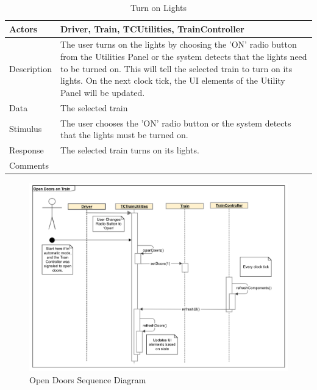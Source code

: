 \documentclass[]{article}
\begin{document}
\begin{table}[H]
	\centering
	\caption{Turn on Lights}
	\begin{tabular}{|l|l|}
		\hline
		Actors & \parbox[t]{10cm}{Driver, Train, TCUtilities, TrainController} \\ \hline
		Description & \parbox[t]{10cm}{The user turns on the lights by choosing the 'ON' radio button from the Utilities Panel or the system detects that the lights need to be turned on. This will tell the selected train to turn on its lights. On the next clock tick, the UI elements of the Utility Panel will be updated.} \\ \hline
		Data &  \parbox[t]{10cm}{The selected train} \\ \hline
		Stimulus &  \parbox[t]{10cm}{The user chooses the 'ON' radio button or the system detects that the lights must be turned on.  } \\ \hline
		Response & \parbox[t]{10cm}{The selected train turns on its lights. }\\ \hline
		Comments & \parbox[t]{10cm}{}  \\ \hline
	\end{tabular}
\end{table}

\begin{figure}[H]
	\centering
	\includegraphics[width=\textwidth]{tc_openDoors_usecase}
	\caption{Open Doors Sequence Diagram}
\end{figure}
\end{document}
